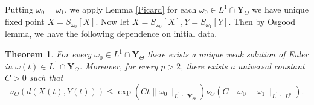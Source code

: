 \documentclass[12pt]{article}
\newtheorem{theorem}{Theorem}
\begin{document}
Putting $\omega_0 = \omega_1$, we apply Lemma \ref{Picard} for each $\omega_0 \in L^1 \cap \mathbf{Y}_{\Theta} $ we have unique fixed point $X = S_{\omega_0} [X]$. Now let $X = S_{\omega_0} [X], Y = S_{\omega_1} [Y]$. Then by Osgood lemma, we have the following dependence on initial data.
\begin{theorem} \label{theorem1}
For every $\omega_0 \in L^1 \cap \mathbf{Y}_{\Theta} $  there exists a unique weak solution of Euler in $\omega(t) \in L^1 \cap \mathbf{Y}_{\Theta} $. Moreover, for every $p > 2$, there exists a universal constant $C>0$ such that
\begin{equation}
\nu_{\Theta} (d(X(t), Y(t) ) ) \le \exp (Ct \| \omega_0 \|_{L^1 \cap \mathbf{Y}_{\Theta} } ) \nu_{\Theta} (C\| \omega_0 - \omega_1 \|_{L^1 \cap L^p }  ).
\end{equation}
\end{theorem}
\end{document}
